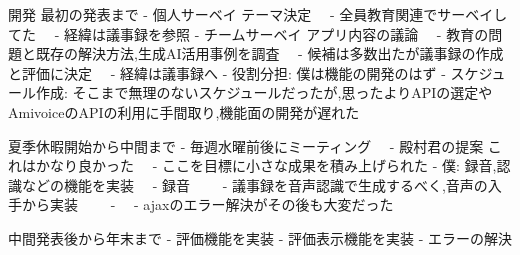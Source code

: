 開発 最初の発表まで
- 個人サーベイ テーマ決定
　- 全員教育関連でサーベイしてた
　- 経緯は議事録を参照
- チームサーベイ アプリ内容の議論
　- 教育の問題と既存の解決方法,生成AI活用事例を調査
　- 候補は多数出たが議事録の作成と評価に決定
　- 経緯は議事録へ
- 役割分担: 僕は機能の開発のはず
- スケジュール作成: そこまで無理のないスケジュールだったが,思ったよりAPIの選定やAmivoiceのAPIの利用に手間取り,機能面の開発が遅れた


夏季休暇開始から中間まで
- 毎週水曜前後にミーティング
　- 殿村君の提案 これはかなり良かった
　- ここを目標に小さな成果を積み上げられた
- 僕: 録音,認識などの機能を実装
　- 録音
　　- 議事録を音声認識で生成するべく,音声の入手から実装
　　- 
　- 
ajaxのエラー解決がその後も大変だった


中間発表後から年末まで
- 評価機能を実装
- 評価表示機能を実装
- エラーの解決


